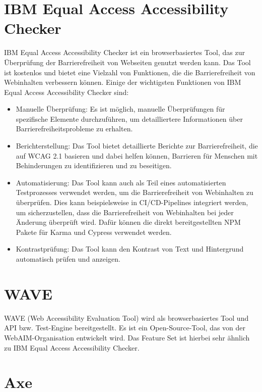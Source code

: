\section{IBM Equal Access Accessibility Checker}
\label{sec:a11yToolsIBMEAAC}

IBM Equal Access Accessibility Checker ist ein browserbasiertes Tool, das zur Überprüfung der Barrierefreiheit von Webseiten genutzt werden kann. Das Tool ist kostenlos und bietet eine Vielzahl von Funktionen, die die Barrierefreiheit von Webinhalten verbessern können. Einige der wichtigsten Funktionen von IBM Equal Access Accessibility Checker sind:

\begin{itemize}
    \item Manuelle Überprüfung: Es ist möglich, manuelle Überprüfungen für spezifische Elemente durchzuführen, um detailliertere Informationen über Barrierefreiheitsprobleme zu erhalten.
    \item Berichterstellung: Das Tool bietet detaillierte Berichte zur Barrierefreiheit, die auf WCAG 2.1 basieren und dabei helfen können, Barrieren für Menschen mit Behinderungen zu identifizieren und zu beseitigen.
    \item Automatisierung: Das Tool kann auch als Teil eines automatisierten Testprozesses verwendet werden, um die Barrierefreiheit von Webinhalten zu überprüfen. Dies kann beispielsweise in CI/CD-Pipelines integriert werden, um sicherzustellen, dass die Barrierefreiheit von Webinhalten bei jeder Änderung überprüft wird. Dafür können die direkt bereitgestellten NPM Pakete für Karma und Cypress verwendet werden.
    \item Kontrastprüfung: Das Tool kann den Kontrast von Text und Hintergrund automatisch prüfen und anzeigen.
\end{itemize}

\section{WAVE}
\label{sec:a11yToolsWAVE}

WAVE (Web Accessibility Evaluation Tool) wird als browserbasiertes Tool und API bzw. Test-Engine bereitgestellt. Es ist ein Open-Source-Tool, das von der WebAIM-Organisation entwickelt wird. Das Feature Set ist hierbei sehr ähnlich zu IBM Equal Access Accessibility Checker.

\section{Axe}
\label{sec:a11yToolsAxe}

